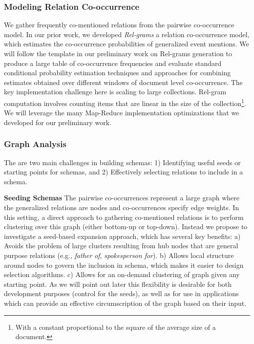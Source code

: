 \subsubsection{Modeling Relation Co-occurrence}

We gather frequently co-mentioned relations from the pairwise co-occurrence model. In our prior work, we developed {\em Rel-grams} a relation co-occurrence model, which estimates the co-occurrence probabilities of generalized event mentions. We will follow the template in our preliminary work on Rel-grams generation to produce a large table of co-occurrence frequencies and evaluate standard conditional probability estimation techniques and approaches for combining estimates obtained over different windows of document level co-occurrence. The key implementation challenge here is scaling to large collections. Rel-gram computation involves counting items that are linear in the size of the collection\footnote{With a constant proportional to the square of the average size of a document.}. We will leverage the many Map-Reduce implementation optimizations that we developed for our preliminary work.

\subsubsection{Graph Analysis}
The are two main challenges in building schemas: 1) Identifying useful seeds or starting points for schemas, and 2) Effectively selecting relations to include in a schema.

\textbf{Seeding Schemas} 
The pairwise co-occurrences represent a large graph where the generalized relations are nodes and co-occurrences specify edge weights. In this setting, a direct approach to gathering co-mentioned relations is to perform clustering over this graph (either bottom-up or top-down). Instead we propose to investigate a seed-based expansion approach, which has several key benefits: a) Avoids the problem of large clusters resulting from hub nodes that are general purpose relations (e.g., {\em father of}, {\em spokesperson for}). b) Allows local structure around nodes to govern the inclusion in schema, which makes it easier to design selection algorithms.  c) Allows for an on-demand clustering of graph given any starting point. As we will point out later this flexibility is desirable for both development purposes (control for the seeds), as well as for use in applications which can provide an effective circumscription of the graph based on their input.

